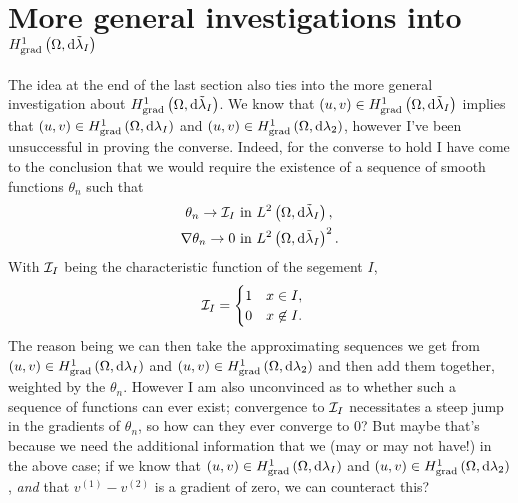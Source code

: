 \documentclass[11pt]{report}
\theoremstyle{plain}
\newcommand{\tlambda}{\tilde{\lambda}}
\begin{document}
\section*{More general investigations into $\gradSob{\ddom}{\tlambda_I}$}
The idea at the end of the last section also ties into the more general investigation about $\gradSob{\ddom}{\tlambda_I}$.
We know that $\bracs{u,v}\in\gradSob{\ddom}{\tlambda_I}$ implies that $\left( u,v \right)\in H^1_\mathrm{grad}\left( \Omega, \mathrm{d}\lambda_I \right)$ and $\left( u,v \right)\in H^1_\mathrm{grad}\left( \Omega, \mathrm{d}\lambda_2 \right)$, however I've been unsuccessful in proving the converse.
Indeed, for the converse to hold I have come to the conclusion that we would require the existence of a sequence of smooth functions $\theta_n$ such that
\begin{align*}
	\theta_n \rightarrow \charFunc{I} &\text{ in } \ltwo{\ddom}{\tlambda_I}, \\
	\grad\theta_n \rightarrow 0 &\text{ in } \ltwo{\ddom}{\tlambda_I}^2.
\end{align*}
With $\mathcal{I}_{I}$ being the characteristic function of the segement $I$,
\begin{align*}
	\mathcal{I}_{I} &= \begin{cases} 1 & x\in I, \\ 0 & x\not\in I. \end{cases}
\end{align*}
The reason being we can then take the approximating sequences we get from $\left( u,v \right)\in H^1_\mathrm{grad}\left( \Omega, \mathrm{d}\lambda_I \right)$ and $\left( u,v \right)\in H^1_\mathrm{grad}\left( \Omega, \mathrm{d}\lambda_2 \right)$ and then add them together, weighted by the $\theta_n$.
However I am also unconvinced as to whether such a sequence of functions can ever exist; convergence to $\mathcal{I}_{I}$ necessitates a steep jump in the gradients of $\theta_n$, so how can they ever converge to 0?
But maybe that's because we need the additional information that we (may or may not have!) in the above case; if we know that $\left( u,v \right)\in H^1_\mathrm{grad}\left( \Omega, \mathrm{d}\lambda_I \right)$ and $\left( u,v \right)\in H^1_\mathrm{grad}\left( \Omega, \mathrm{d}\lambda_2 \right)$, \textit{and} that $v^{(1)}-v^{(2)}$ is a gradient of zero, we can counteract this?
\end{document}
